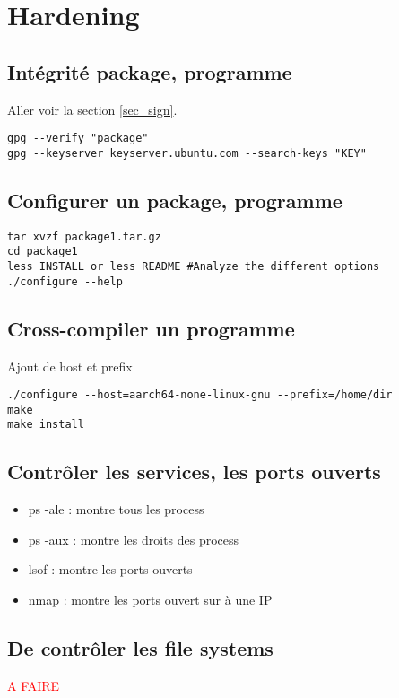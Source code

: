 \section{Hardening}

\subsection{Intégrité package, programme}
Aller voir la section \ref{sec_sign}.
\begin{lstlisting}[style=console]
gpg --verify "package"
gpg --keyserver keyserver.ubuntu.com --search-keys "KEY"
\end{lstlisting}

\subsection{Configurer un package, programme}
\begin{lstlisting}[style=console]
tar xvzf package1.tar.gz
cd package1
less INSTALL or less README #Analyze the different options
./configure --help
\end{lstlisting}

\subsection{Cross-compiler un programme}
Ajout de host et prefix
\begin{lstlisting}[style=console]
./configure --host=aarch64-none-linux-gnu --prefix=/home/dir
make 
make install
\end{lstlisting}

\subsection{Contrôler les services, les ports ouverts}
\begin{itemize}
\item ps -ale : montre tous les process
\item ps -aux : montre les droits des process
\item lsof    : montre les ports ouverts
\item nmap    : montre les ports ouvert sur à une IP

\end{itemize}


\subsection{De contrôler les file systems}
\textcolor{red}{A FAIRE}


